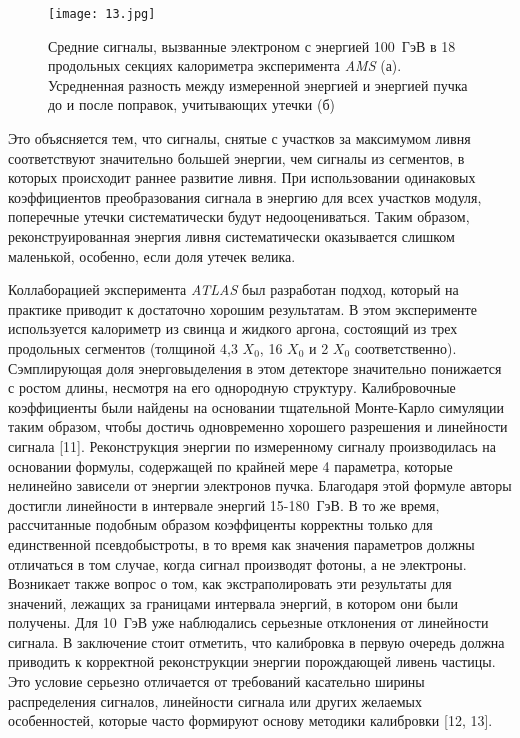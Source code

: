 \begin{figure}[H]
    \centering
    \texttt{[image: 13.jpg]}
    \caption{Средние сигналы, вызванные электроном с энергией \mbox{100 ГэВ} в 18 продольных секциях калориметра эксперимента \textit{AMS} (а). Усредненная разность между измеренной энергией и энергией пучка до и после поправок, учитывающих утечки (б) }
    \label{fig:leakAMS}
\end{figure}

Это объясняется тем, что сигналы, снятые с участков за максимумом ливня соответствуют  значительно  большей  энергии,  чем  сигналы  из сегментов,  в которых происходит раннее развитие ливня. При использовании одинаковых коэффициентов преобразования сигнала в энергию для всех участков модуля, поперечные утечки систематически будут недооцениваться. Таким образом, реконструированная  энергия  ливня  систематически  оказывается  слишком маленькой, особенно, если доля утечек велика. 

Коллаборацией эксперимента \textit{ATLAS} был разработан подход, который на  практике  приводит  к  достаточно  хорошим  результатам.  В  этом эксперименте  используется  калориметр  из  свинца  и  жидкого  аргона, состоящий  из  трех  продольных  сегментов  (толщиной 4,3 $X_0$,  16 $X_0$ и 2 $X_0$ соответственно).  Сэмплирующая  доля  энерговыделения  в  этом  детекторе значительно  понижается  с  ростом  длины,  несмотря  на  его  однородную структуру.  Калибровочные  коэффициенты  были  найдены  на  основании тщательной  Монте-Карло  симуляции  таким  образом,  чтобы  достичь одновременно   хорошего   разрешения   и   линейности   сигнала [11]. Реконструкция  энергии  по  измеренному  сигналу  производилась  на основании  формулы,  содержащей  по  крайней  мере  4  параметра,  которые нелинейно зависели от энергии электронов пучка. Благодаря этой формуле авторы  достигли линейности  в  интервале  энергий  \mbox{15-180 ГэВ}. В то же время, рассчитанные подобным образом коэффиценты корректны только для единственной псевдобыстроты, в то время как значения параметров должны отличаться в том случае, когда сигнал производят фотоны, а не электроны. Возникает  также  вопрос  о  том, как  экстраполировать  эти  результаты  для значений,  лежащих  за  границами  интервала  энергий,  в  котором  они  были получены.  Для  \mbox{10  ГэВ}  уже  наблюдались  серьезные  отклонения  от линейности сигнала. В  заключение  стоит  отметить,  что  калибровка  в  первую  очередь должна  приводить  к  корректной  реконструкции  энергии  порождающей ливень частицы. Это условие серьезно отличается от требований касательно ширины распределения сигналов, линейности сигнала или других желаемых особенностей, которые часто формируют основу методики калибровки [12, 13]. 
